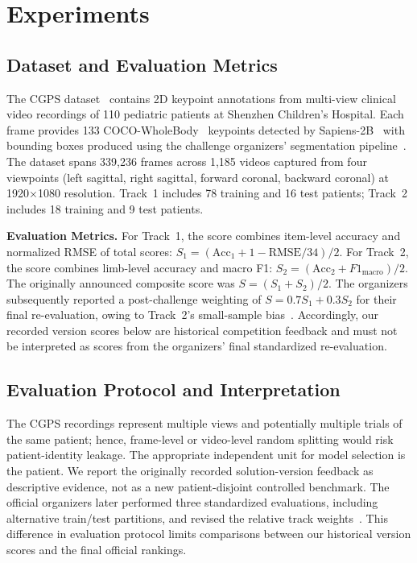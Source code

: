 \section{Experiments}
\label{sec:experiments}

\subsection{Dataset and Evaluation Metrics}
\label{sec:dataset}

The CGPS dataset~\cite{cv4chl2026} contains 2D keypoint annotations from multi-view clinical video recordings of 110 pediatric patients at Shenzhen Children's Hospital. Each frame provides 133 COCO-WholeBody~\cite{jin2020whole} keypoints detected by Sapiens-2B~\cite{khirodkar2024sapiens} with bounding boxes produced using the challenge organizers' segmentation pipeline~\cite{cv4chl2026}. The dataset spans 339,236 frames across 1,185 videos captured from four viewpoints (left sagittal, right sagittal, forward coronal, backward coronal) at 1920$\times$1080 resolution. Track~1 includes 78 training and 16 test patients; Track~2 includes 18 training and 9 test patients.

\noindent\textbf{Evaluation Metrics.}
For Track~1, the score combines item-level accuracy and normalized RMSE of total scores:
$S_1 = (\text{Acc}_1 + 1 - \text{RMSE}/34) / 2$.
For Track~2, the score combines limb-level accuracy and macro F1:
$S_2 = (\text{Acc}_2 + F1_{\text{macro}}) / 2$.
The originally announced composite score was $S = (S_1 + S_2) / 2$. The organizers subsequently reported a post-challenge weighting of $S = 0.7S_1 + 0.3S_2$ for their final re-evaluation, owing to Track~2's small-sample bias~\cite{cv4chl2026}. Accordingly, our recorded version scores below are historical competition feedback and must not be interpreted as scores from the organizers' final standardized re-evaluation.


\subsection{Evaluation Protocol and Interpretation}
\label{sec:protocol}
The CGPS recordings represent multiple views and potentially multiple trials of the same patient; hence, frame-level or video-level random splitting would risk patient-identity leakage. The appropriate independent unit for model selection is the patient. We report the originally recorded solution-version feedback as descriptive evidence, not as a new patient-disjoint controlled benchmark. The official organizers later performed three standardized evaluations, including alternative train/test partitions, and revised the relative track weights~\cite{cv4chl2026}. This difference in evaluation protocol limits comparisons between our historical version scores and the final official rankings.

